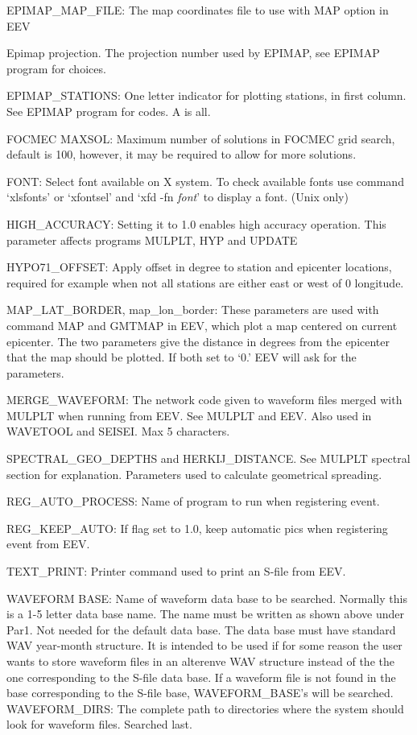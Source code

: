 EPIMAP\_MAP\_FILE: The map coordinates file to use with MAP option in EEV 

Epimap projection. The projection number used by EPIMAP, see EPIMAP program for choices.

EPIMAP\_STATIONS: One letter indicator for plotting stations, in first column. See EPIMAP program for codes. A is all. 

FOCMEC MAXSOL: Maximum number of solutions in FOCMEC grid search, default is 100, however, 
it may be required to allow for more solutions.

FONT: Select font available on X system. To check available fonts use command `xlsfonts' or `xfontsel' and `xfd -fn \textit{font}' to display a font. (Unix only) 

HIGH\_ACCURACY: Setting it to 1.0 enables high accuracy operation. This parameter affects programs 
MULPLT, HYP and UPDATE

HYPO71\_OFFSET: Apply offset in degree to station and epicenter locations, required for example when not all stations are either east or west of 0 longitude. 

MAP\_LAT\_BORDER, map\_lon\_border: These parameters are used with command MAP and GMTMAP in EEV, which plot a map centered on current epicenter. The two parameters give the distance in degrees from the epicenter that the map should be plotted. If both set to `0.' EEV will ask for the parameters. 

MERGE\_WAVEFORM: The network code given to waveform files merged with MULPLT when running 
from EEV. See MULPLT and EEV. Also used in WAVETOOL and SEISEI. Max 5 characters.

SPECTRAL\_GEO\_DEPTHS and HERKIJ\_DISTANCE. See MULPLT spectral section for explanation. Parameters used to calculate geometrical spreading. 

REG\_AUTO\_PROCESS: Name of program to run when registering event.

REG\_KEEP\_AUTO: If flag set to 1.0, keep automatic pics when registering event from EEV.  

TEXT\_PRINT: Printer command used to print an S-file from EEV.

WAVEFORM BASE: Name of waveform data base to be searched. Normally this is a 1-5 letter data base name. The name must be written as shown above under Par1. Not needed for the default data base. The data base must have standard WAV year-month structure. It is intended to be used if for some reason the user wants to store waveform files
in an alterenve WAV structure instead of the the one corresponding to the S-file data base. If a waveform file is not found in the base corresponding to the S-file base, WAVEFORM\_BASE's will be searched.
WAVEFORM\_DIRS: The complete path to directories where the system should look for waveform files. Searched last.

